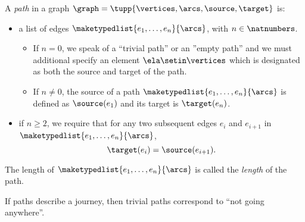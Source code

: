 \begin{definition}[Paths]
    \label{def:path}
    A \emph{path} in a graph $\graph=\tupp{\vertices,\arcs, \source,\target}$ is:

    \constit

    \begin{itemize}
        \item a list of edges $\maketypedlist{e_1, \dots, e_n}{\arcs}$, with $n \in \natnumbers$.
              \begin{itemize}
                  \item If $n = 0$, we speak of a ``trivial path'' or an ''empty path'' and we must additional specify an element $\ela \setin \vertices$ which is designated as both the source and target of the path.
                  \item If $n \neq 0$, the source of a path $\maketypedlist{e_1, \dots, e_n}{\arcs}$ is defined as $\source(e_1)$ and its target is $\target(e_n)$.
              \end{itemize}
    \end{itemize}

    \condit

    \begin{itemize}
        \item if $n \geq 2$, we require that for any two subsequent edges $e_i$ and $e_{i+1}$ in $\maketypedlist{e_1, \dots, e_n}{\arcs}$,
              \begin{equation}
                  \target(e_i) = \source(e_{i+1}).
              \end{equation}
    \end{itemize}
    The length of $\maketypedlist{e_1, \dots, e_n}{\arcs}$ is called the \emph{length} of the path.
\end{definition}

\begin{remark}
    If paths describe a journey, then trivial paths correspond to ``not going anywhere''.
\end{remark}
